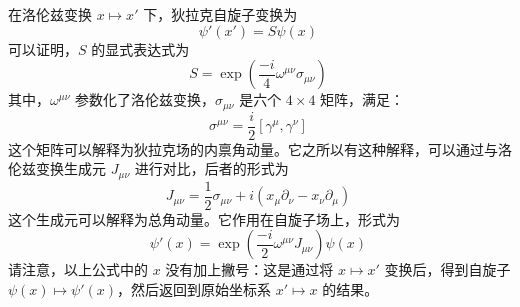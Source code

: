 在洛伦兹变换 \( x \mapsto x' \) 下，狄拉克自旋子变换为  
\[
\psi'(x') = S \psi(x)~
\]  
可以证明，\( S \) 的显式表达式为  
\[
S = \exp \left( \frac{-i}{4} \omega^{\mu \nu} \sigma_{\mu \nu} \right)~
\]  
其中，\( \omega^{\mu \nu} \) 参数化了洛伦兹变换，\( \sigma_{\mu \nu} \) 是六个 \( 4 \times 4 \) 矩阵，满足：
\[
\sigma^{\mu \nu} = \frac{i}{2} [\gamma^\mu, \gamma^\nu]~
\]
这个矩阵可以解释为狄拉克场的内禀角动量。它之所以有这种解释，可以通过与洛伦兹变换生成元 \( J_{\mu \nu} \) 进行对比，后者的形式为  
\[
J_{\mu \nu} = \frac{1}{2} \sigma_{\mu \nu} + i \left( x_\mu \partial_\nu - x_\nu \partial_\mu \right)~
\]  
这个生成元可以解释为总角动量。它作用在自旋子场上，形式为  
\[
\psi'(x) = \exp \left( \frac{-i}{2} \omega^{\mu \nu} J_{\mu \nu} \right) \psi(x)~
\]  
请注意，以上公式中的 \( x \) 没有加上撇号：这是通过将 \( x \mapsto x' \) 变换后，得到自旋子 \( \psi(x) \mapsto \psi'(x) \)，然后返回到原始坐标系 \( x' \mapsto x \) 的结果。














































































